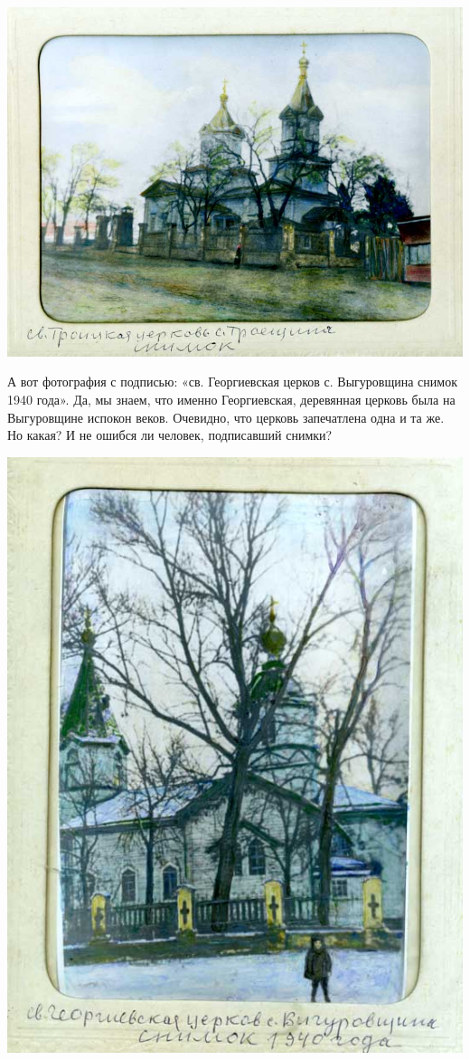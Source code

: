 \begin{center}
\includegraphics[width=0.93\linewidth]{chast-gorodki/vyg-troya/cerk-troick.jpg}
\end{center}

А вот фотография с подписью: «св. Георгиевская церков с. Выгуровщина снимок 1940 года». Да, мы знаем, что именно Георгиевская, деревянная церковь была на Выгуровщине испокон веков. Очевидно, что церковь запечатлена одна и та же. Но какая? И не ошибся ли человек, подписавший снимки?
\vspace*{\fill}
\begin{center}
\includegraphics[width=\linewidth]{chast-gorodki/vyg-troya/cerk-georg.jpg}
\end{center}
\vspace*{\fill}
\newpage

